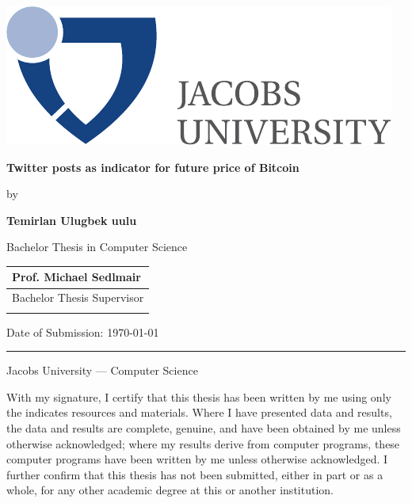 \documentclass[a4paper,11pt,oneside]{article}
\newcommand{\myname}{Temirlan Ulugbek uulu}
\newcommand{\mytitle}{Twitter posts as indicator for future price of Bitcoin}
\newcommand{\mysupervisor}{Prof. Michael Sedlmair}
\begin{document}

  \thispagestyle{empty}

  \begin{flushright}
    \includegraphics[scale=0.7]{bsc-logo}
  \end{flushright}
  \vspace{20mm}
  \begin{center}
    \huge
    \textbf{\mytitle}
  \end{center}
  \vspace*{4mm}
  \begin{center}
   \Large by
  \end{center}
  \vspace*{4mm}
  \begin{center}
    \Large
    \textbf{\myname}
  \end{center}
  \vspace*{20mm}
  \begin{center}
    \large
    Bachelor Thesis in Computer Science
  \end{center}
  \vfill
  \begin{flushright}
    \large
    \begin{tabular}{l}
      \mysupervisor \\
      \hline
      Bachelor Thesis Supervisor \\
      \\
    \end{tabular}
  \end{flushright}
  \vspace*{8mm}
  \begin{flushleft}
    \large
    Date of Submission: \today \\
    \rule{\textwidth}{1pt}
  \end{flushleft}
  \begin{center}
    \Large Jacobs University --- Computer Science
  \end{center}

  \newpage
  \thispagestyle{empty}

  With my signature, I certify that this thesis has been written by me
  using only the indicates resources and materials. Where I have
  presented data and results, the data and results are complete,
  genuine, and have been obtained by me unless otherwise acknowledged;
  where my results derive from computer programs, these computer
  programs have been written by me unless otherwise acknowledged. I
  further confirm that this thesis has not been submitted, either in
  part or as a whole, for any other academic degree at this or another
  institution.
\end{document}
